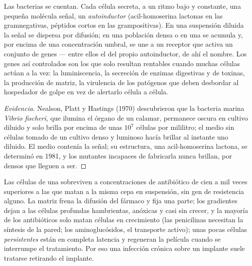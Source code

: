 \begin{proposition}\label{prop:b2:microbial-metabolism:quorum}
Las bacterias se cuentan. Cada célula secreta, a un ritmo bajo y
constante, una pequeña molécula señal, un \emph{autoinductor}
(acil-homoserina lactonas en las gramnegativas, péptidos cortos en las
grampositivas). En una suspensión diluida la señal se dispersa por
difusión; en una población densa o en una  se acumula y, por
encima de una concentración umbral, se une a un receptor que activa un
conjunto de genes --- entre ellos el del propio autoinductor, de ahí el
nombre. Los genes así controlados son los que solo resultan rentables
cuando muchas células actúan a la vez: la luminiscencia, la secreción de
enzimas digestivas y de toxinas, la producción de matriz, la virulencia
de los patógenos que deben desbordar al hospedador de golpe en vez de
alertarlo célula a célula.
\end{proposition}
\begin{proof}[Evidencia]
Nealson, Platt y Hastings (1970) descubrieron que la bacteria marina
\emph{Vibrio fischeri}, que ilumina el órgano de un calamar, permanece
oscura en cultivo diluido y solo brilla por encima de unas $10^{7}$
células por mililitro; el medio sin células tomado de un cultivo denso y
luminoso hacía brillar al instante uno diluido. El medio contenía la
señal; su estructura, una acil-homoserina lactona, se determinó en 1981,
y los mutantes incapaces de fabricarla nunca brillan, por densos que
lleguen a ser.
\end{proof}

\begin{example}\label{ex:b2:microbial-metabolism:tolerance}
Las células de una  sobreviven a concentraciones de
antibiótico de cien a mil veces superiores a las que matan a la misma
cepa en suspensión, sin gen de resistencia alguno. La matriz frena la
difusión del fármaco y fija una parte; los gradientes dejan a las células
profundas hambrientas, anóxicas y casi sin crecer, y la mayoría de los
antibióticos solo matan células en crecimiento (las penicilinas
necesitan la síntesis de la pared; los aminoglucósidos, el transporte
activo); unas pocas células \emph{persistentes} están en completa
latencia y regeneran la película cuando se interrumpe el tratamiento.
Por eso una infección crónica sobre un implante suele tratarse
retirando el implante.
\end{example}

